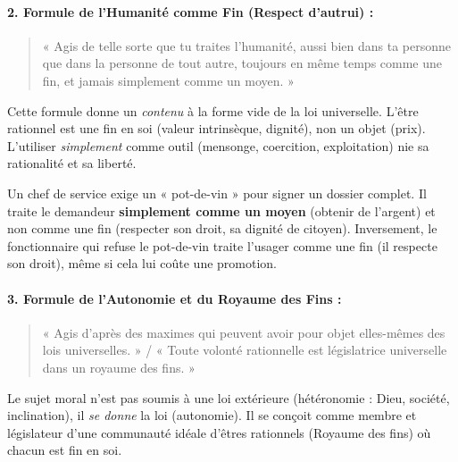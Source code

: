 \documentclass[11pt]{article}
\newcommand{\cle}[1]{{\popxbold\color{popdark}#1}}
\begin{document}
\paragraph{2. Formule de l'Humanité comme Fin (Respect d'autrui) :}
\begin{quote}
« Agis de telle sorte que tu traites l'humanité, aussi bien dans ta personne que dans la personne de tout autre, toujours en même temps comme une fin, et jamais simplement comme un moyen. »
\end{quote}
Cette formule donne un \emph{contenu} à la forme vide de la loi universelle. L'être rationnel est une \cle{fin en soi} (valeur intrinsèque, dignité), non un objet (prix). L'utiliser \emph{simplement} comme outil (mensonge, coercition, exploitation) nie sa rationalité et sa liberté.

\begin{exemplebox}
Un chef de service exige un « pot-de-vin » pour signer un dossier complet. Il traite le demandeur \textbf{simplement comme un moyen} (obtenir de l'argent) et non comme une fin (respecter son droit, sa dignité de citoyen). Inversement, le fonctionnaire qui refuse le pot-de-vin traite l'usager comme une fin (il respecte son droit), même si cela lui coûte une promotion.
\end{exemplebox}

\paragraph{3. Formule de l'Autonomie et du Royaume des Fins :}
\begin{quote}
« Agis d'après des maximes qui peuvent avoir pour objet elles-mêmes des lois universelles. » / « Toute volonté rationnelle est législatrice universelle dans un royaume des fins. »
\end{quote}
Le sujet moral n'est pas soumis à une loi extérieure (hétéronomie : Dieu, société, inclination), il \emph{se donne} la loi (autonomie). Il se conçoit comme membre et législateur d'une communauté idéale d'êtres rationnels (Royaume des fins) où chacun est fin en soi.
\end{document}
